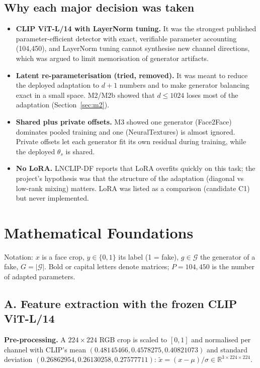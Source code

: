 \documentclass[10pt,a4paper]{article}
\begin{document}
\subsection{Why each major decision was taken}
\begin{itemize}
\item \textbf{CLIP ViT-L/14 with LayerNorm tuning.} It was the strongest published parameter-efficient
detector with exact, verifiable parameter accounting (104,450), and LayerNorm tuning cannot
synthesise new channel directions, which was argued to limit memorisation of generator artifacts.
\item \textbf{Latent re-parameterisation (tried, removed).} It was meant to reduce the deployed
adaptation to \(d+1\) numbers and to make generator balancing exact in a small space. M2/M2b showed
that \(d\le1024\) loses most of the adaptation (Section~\ref{sec:m2}).
\item \textbf{Shared plus private offsets.} M3 showed one generator (Face2Face) dominates pooled
training and one (NeuralTextures) is almost ignored. Private offsets let each generator fit its own
residual during training, while the deployed \(\theta_s\) is shared.
\item \textbf{No LoRA.} LNCLIP-DF reports that LoRA overfits quickly on this task; the project's
hypothesis was that the structure of the adaptation (diagonal vs low-rank mixing) matters. LoRA was
listed as a comparison (candidate C1) but never implemented.
\end{itemize}

\section{Mathematical Foundations}\label{sec:math}
Notation: \(x\) is a face crop, \(y\in\{0,1\}\) its label (1 = fake), \(g\in\mathcal{G}\) the generator
of a fake, \(G=|\mathcal{G}|\). Bold or capital letters denote matrices; \(P=104{,}450\) is the number
of adapted parameters.

\subsection{A. Feature extraction with the frozen CLIP ViT-L/14}\label{sec:clip}
\textbf{Pre-processing.} A \(224\times224\) RGB crop is scaled to \([0,1]\) and normalised per channel
with CLIP's mean \((0.48145466,0.4578275,0.40821073)\) and standard deviation
\((0.26862954,0.26130258,0.27577711)\): \(\tilde x=(x-\mu)/\sigma\in\mathbb{R}^{3\times224\times224}\).
\end{document}
